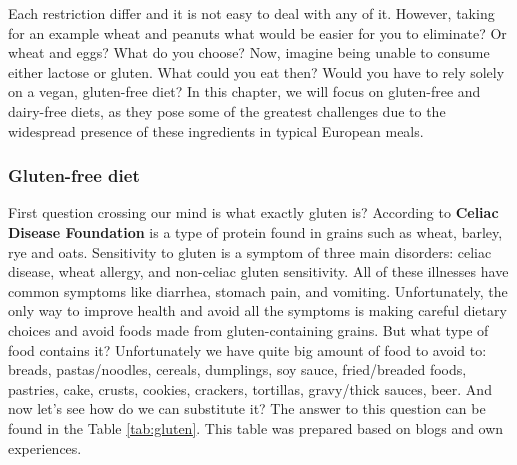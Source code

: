 Each restriction differ and it is not easy to deal with any of it. However, taking for an example wheat and peanuts what would be easier for you to eliminate? Or wheat and eggs? What do you choose? Now, imagine being unable to consume either lactose or gluten. What could you eat then? Would you have to rely solely on a vegan, gluten-free diet? 
In this chapter, we will focus on gluten-free and dairy-free diets, as they pose some of the greatest challenges due to the widespread presence of these ingredients in typical European meals. 

\subsubsection{Gluten-free diet}
First question crossing our mind is what exactly gluten is? According to \textbf{Celiac Disease Foundation}\cite{WhatIsGluten} is a type of protein found in grains such as wheat, barley, rye and oats. Sensitivity to gluten is a symptom of three main disorders: celiac disease, wheat allergy, and non-celiac gluten sensitivity. All of these illnesses have common symptoms like diarrhea, stomach pain, and vomiting. 
Unfortunately, the only way  to improve health and avoid all the symptoms is making careful dietary choices and avoid foods made from gluten-containing grains. But what type of food contains it?
Unfortunately we have quite big amount of food to avoid to:
breads, pastas/noodles, cereals, dumplings, soy sauce, fried/breaded foods, pastries, cake, crusts, cookies, crackers, tortillas, gravy/thick sauces, beer. And now let's see how do we can substitute it?
The answer to this question can be found in the Table \ref{tab:gluten}. This table was prepared based on blogs \cite{GlutenFreeDiet}\cite{GlutenFreeSubstitutions}\cite{ActivateGlutenFree} and own experiences.


